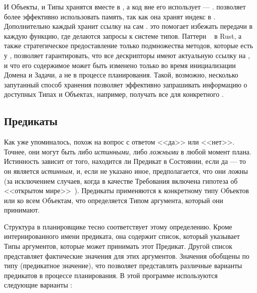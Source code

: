 И Объекты, и Типы хранятся вместе в ,
а код вне его использует  --- .
 позволяет более эффективно использовать память,
так как она хранят индекс в .
Дополнительно каждый  хранит ссылку на сам .
это помогает избежать передачи  в каждую функцию,
где делаются запросы к системе типов.
Паттерн ~\cite{interiormut} в Rust,
а также стратегическое предоставление только подмножества методов,
которые есть у , позволяет гарантировать,
что все дескрипторы имеют актуальную ссылку на ,
и что его содержимое может быть изменено только во время инициализации Домена и Задачи,
а не в процессе планирования.
Такой, возможно, несколько запутанный способ хранения позволяет
эффективно запрашивать информацию о доступных Типах и Объектах,
например, получать все  для конкретного .

\subsection{Предикаты}

Как уже упоминалось,  похож на вопрос с ответом <<да>> или <<нет>>.
Точнее, они могут быть либо \textit{истинными}, либо \textit{ложными} в любой момент плана.
Истинность зависит от того, находится ли Предикат в Состоянии,
если да --- то он является \textit{истинным},
и, если не указано иное, предполагается, что они ложны
(за исключением случаев, когда в качестве Требования включена гипотеза об <<открытом мире>>~\cite{marks1990planning,Keet2013}).
Предикаты применяются к конкретному типу Oбъектов или ко всем Oбъектам,
что определяется Типом аргумента, который они принимают.

Структура  в планировщике тесно соответствует этому определению.
Кроме интернированного имени предиката,
она содержит список, который указывает Типы
аргументов, которые может принимать этот Предикат.
Другой список представляет фактические значения для этих аргументов.
Значения обобщены по типу  (предикатное значение),
что позволяет представлять различные варианты предикатов в процессе планирования\footnotemark{}.
В этой программе используются следующие варианты :

